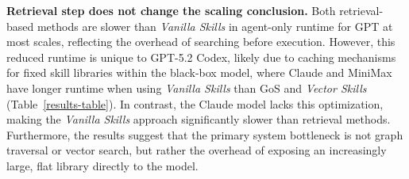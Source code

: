 \noindent\textbf{Retrieval step does not change the scaling conclusion.}
Both retrieval-based methods are slower than \textit{Vanilla Skills} in agent-only runtime for GPT at most scales, reflecting the overhead of searching before execution. 
%
However, this reduced runtime is unique to GPT-5.2 Codex, likely due to caching mechanisms for fixed skill libraries within the black-box model, where Claude and MiniMax have longer runtime when using \textit{Vanilla Skills} than GoS and \textit{Vector Skills} (Table~\ref{results-table}).
%
In contrast, the Claude model lacks this optimization, making the \textit{Vanilla Skills} approach significantly slower than retrieval methods. 
%
Furthermore, the results suggest that the primary system bottleneck is not graph traversal or vector search, but rather the overhead of exposing an increasingly large, flat library directly to the model.


